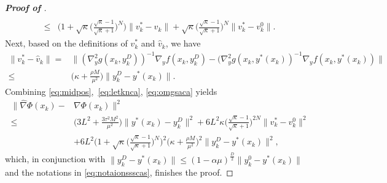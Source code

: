 \documentclass{osudissert96}
\begin{document}
\begin{proof}[\bf Proof of ]
\begin{align}
 \\\leq& \Big(1+\sqrt{\kappa}\Big( \frac{\sqrt{\kappa}-1}{\sqrt{\kappa}+1} \Big)^N\Big) \|v_k^*-\widehat v_k\| + \sqrt{\kappa}\Big( \frac{\sqrt{\kappa}-1}{\sqrt{\kappa}+1} \Big)^N\|v_k^*-v_k^0\|. 
 \end{align}
Next, based on the definitions of $v_k^*$ and $ \widehat v_k$, we have 
\begin{align}\label{eq:omgsaca}
\|v_k^*-\widehat v_k\|=& \|(\nabla_y^2g(x_k,y^D_k))^{-1}\nabla_y f(x_k,y^D_k) -(\nabla_y^2g(x_k,y^*(x_k))^{-1}\nabla_y f(x_k,y^*(x_k))\| \nonumber
\\\leq & \Big(\kappa +\frac{\rho M}{\mu^2} \Big)\|y^D_k-y^*(x_k)\|. 
\end{align}
Combining \cref{eq:midpos},~\cref{eq:letknca}, \cref{eq:omgsaca} yields
\begin{align*}
\|\widehat \nabla \Phi(x_k)- &\nabla \Phi(x_k)\|^2 
\\\leq &\Big(3L^2+\frac{3\tau^2 M^2}{\mu^2}\Big)\|y^*(x_k)-y_k^D\|^2 + 6L^2 \kappa \Big( \frac{\sqrt{\kappa}-1}{\sqrt{\kappa}+1} \Big)^{2N}\|v_k^*-v_k^0\|^2 \nonumber
\\&+ 6L^2\Big(1+\sqrt{\kappa}\Big( \frac{\sqrt{\kappa}-1}{\sqrt{\kappa}+1} \Big)^N\Big)^2\Big(\kappa +\frac{\rho M}{\mu^2} \Big)^2\|y^D_k-y^*(x_k)\|^2, 
\end{align*}
which, in conjunction with $\|y_k^{D} -y^*(x_k)\| \leq (1-\alpha\mu)^{\frac{D}{2}} \|y^0_k-y^*(x_k)\|$ and the notations in \cref{eq:notaionssscas}, finishes the proof. 
\end{proof}
\end{document}
